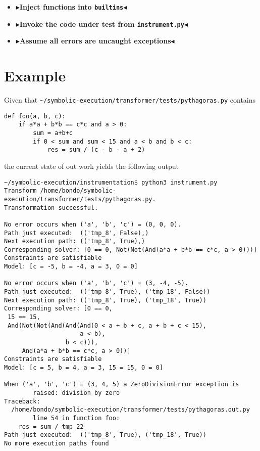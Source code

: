 \documentclass[11pt]{report}
\newcommand{\todo}[1]{{\color[rgb]{.5,0,0}\textbf{$\blacktriangleright$#1$\blacktriangleleft$}}}
\begin{document}
\begin{itemize}
\item \todo{Inject functions into \verb|builtins|}
\item \todo{Invoke the code under test from \verb|instrument.py|}
\item \todo{Assume all errors are uncaught exceptions}
\end{itemize}

\section{Example}

Given that \verb|~/symbolic-execution/transformer/tests/pythagoras.py| contains
\begin{verbatim}
def foo(a, b, c):
    if a*a + b*b == c*c and a > 0:
        sum = a+b+c
        if 0 < sum and sum < 15 and a < b and b < c:
            res = sum / (c - b - a + 2)
\end{verbatim}

the current state of out work yields the following output

\begin{verbatim}
~/symbolic-execution/instrumentation$ python3 instrument.py
Transform /home/bondo/symbolic-execution/transformer/tests/pythagoras.py.
Transformation successful.

No error occurs when ('a', 'b', 'c') = (0, 0, 0).
Path just executed:  (('tmp_8', False),)
Next execution path: (('tmp_8', True),)
Corresponding solver: [0 == 0, Not(Not(And(a*a + b*b == c*c, a > 0)))]
Constraints are satisfiable
Model: [c = -5, b = -4, a = 3, 0 = 0] 

No error occurs when ('a', 'b', 'c') = (3, -4, -5).
Path just executed:  (('tmp_8', True), ('tmp_18', False))
Next execution path: (('tmp_8', True), ('tmp_18', True))
Corresponding solver: [0 == 0,
 15 == 15,
 And(Not(Not(And(And(And(0 < a + b + c, a + b + c < 15),
                     a < b),
                 b < c))),
     And(a*a + b*b == c*c, a > 0))]
Constraints are satisfiable
Model: [c = 5, b = 4, a = 3, 15 = 15, 0 = 0] 

When ('a', 'b', 'c') = (3, 4, 5) a ZeroDivisionError exception is
        raised: division by zero
Traceback:
  /home/bondo/symbolic-execution/transformer/tests/pythagoras.out.py
        line 54 in function foo:
    res = sum / tmp_22
Path just executed:  (('tmp_8', True), ('tmp_18', True))
No more execution paths found
\end{verbatim}
\end{document}
